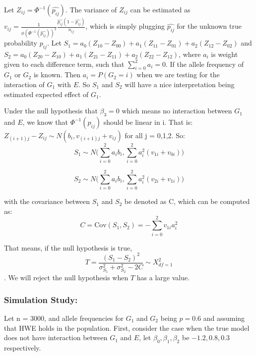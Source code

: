\documentclass[]{article}
\begin{document}
Let \(Z_{ij} = \Phi^{-1}(\hat{p_{ij}})\). The variance of \(Z_{ij}\) can
be estimated as
\(v_{ij} = \frac{1}{\phi(\Phi^{-1}(\hat{p_{ij}}))^2}\frac{\hat{p_{ij}}(1-\hat{p_{ij}})}{n_{ij}}\),
which is simply plugging \(\hat{p_{ij}}\) for the unknown true
probability \(p_{ij}\). Let
\(S_1 = a_0(Z_{10}-Z_{00}) + a_1(Z_{11}-Z_{01}) + a_2(Z_{12}-Z_{02})\)
and
\(S_2 = a_0(Z_{20}-Z_{10}) + a_1(Z_{21}-Z_{11}) + a_2(Z_{22}-Z_{12})\),
where \(a_i\) is weight given to each difference term, such that
\(\sum_{i=0}^2 a_i =0\). If the allele frequency of \(G_1\) or \(G_2\)
is known. Then \(a_i = P(G_2 =i)\) when we are testing for the
interaction of \(G_1\) with \(E\). So \(S_1\) and \(S_2\) will have a
nice interpretation being estimated expected effect of \(G_1\).

Under the null hypothesis that \(\beta_3 =0\) which means no interaction
between \(G_1\) and \(E\), we know that \(\Phi^{-1}(p_{ij})\) should be
linear in i. That is:
\(Z_{(i+1)j} - Z_{ij} \sim N(b_i,v_{(i+1)j} + v_{ij})\) for all j =
0,1,2. So:
\[S_1 \sim N\bigg(\sum_{i=0}^{2}a_ib_i,\sum_{i=0}^{2}a_i^2(v_{1i}+v_{0i})\bigg) \]

\[S_2 \sim N\bigg(\sum_{i=0}^{2}a_ib_i,\sum_{i=0}^{2}a_i^2(v_{2i}+v_{1i})\bigg) \]

with the covariance between \(S_1\) and \(S_2\) be denoted as C, which
can be computed as:
\[ C = \text{Cov}(S_1,S_2) = -\sum_{i=0}^{2}v_{1i}a_i^2 \]

That means, if the null hypothesis is true,
\[ T = \frac{(S_1-S_2)^2}{\sigma_{S_1}^2+\sigma_{S_2}^2 -2C} \sim X^2_{df=1}\].
We will reject the null hypothesis when \(T\) has a large value.

\hypertarget{simulation-study}{%
\subsubsection{Simulation Study:}\label{simulation-study}}

Let n = 3000, and allele frequencies for \(G_1\) and \(G_2\) being
\(p=0.6\) and assuming that HWE holds in the population. First, consider
the case when the true model does not have interaction between \(G_1\)
and \(E\), let \(\beta_0,\beta_1,\beta_2\) be \(-1.2,0.8,0.3\)
respectively.
\end{document}
